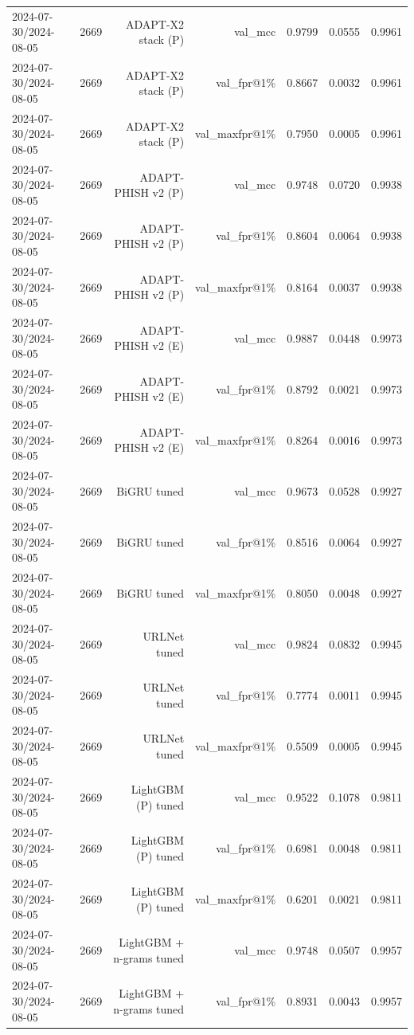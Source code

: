 \begin{table}[t]
\begin{tabular}{llrrrrr}
2024-07-30/2024-08-05 & 2669 & ADAPT-X2 stack (P) & val\_mcc & 0.9799 & 0.0555 & 0.9961 \\
2024-07-30/2024-08-05 & 2669 & ADAPT-X2 stack (P) & val\_fpr@1\% & 0.8667 & 0.0032 & 0.9961 \\
2024-07-30/2024-08-05 & 2669 & ADAPT-X2 stack (P) & val\_maxfpr@1\% & 0.7950 & 0.0005 & 0.9961 \\
2024-07-30/2024-08-05 & 2669 & ADAPT-PHISH v2 (P) & val\_mcc & 0.9748 & 0.0720 & 0.9938 \\
2024-07-30/2024-08-05 & 2669 & ADAPT-PHISH v2 (P) & val\_fpr@1\% & 0.8604 & 0.0064 & 0.9938 \\
2024-07-30/2024-08-05 & 2669 & ADAPT-PHISH v2 (P) & val\_maxfpr@1\% & 0.8164 & 0.0037 & 0.9938 \\
2024-07-30/2024-08-05 & 2669 & ADAPT-PHISH v2 (E) & val\_mcc & 0.9887 & 0.0448 & 0.9973 \\
2024-07-30/2024-08-05 & 2669 & ADAPT-PHISH v2 (E) & val\_fpr@1\% & 0.8792 & 0.0021 & 0.9973 \\
2024-07-30/2024-08-05 & 2669 & ADAPT-PHISH v2 (E) & val\_maxfpr@1\% & 0.8264 & 0.0016 & 0.9973 \\
2024-07-30/2024-08-05 & 2669 & BiGRU tuned & val\_mcc & 0.9673 & 0.0528 & 0.9927 \\
2024-07-30/2024-08-05 & 2669 & BiGRU tuned & val\_fpr@1\% & 0.8516 & 0.0064 & 0.9927 \\
2024-07-30/2024-08-05 & 2669 & BiGRU tuned & val\_maxfpr@1\% & 0.8050 & 0.0048 & 0.9927 \\
2024-07-30/2024-08-05 & 2669 & URLNet tuned & val\_mcc & 0.9824 & 0.0832 & 0.9945 \\
2024-07-30/2024-08-05 & 2669 & URLNet tuned & val\_fpr@1\% & 0.7774 & 0.0011 & 0.9945 \\
2024-07-30/2024-08-05 & 2669 & URLNet tuned & val\_maxfpr@1\% & 0.5509 & 0.0005 & 0.9945 \\
2024-07-30/2024-08-05 & 2669 & LightGBM (P) tuned & val\_mcc & 0.9522 & 0.1078 & 0.9811 \\
2024-07-30/2024-08-05 & 2669 & LightGBM (P) tuned & val\_fpr@1\% & 0.6981 & 0.0048 & 0.9811 \\
2024-07-30/2024-08-05 & 2669 & LightGBM (P) tuned & val\_maxfpr@1\% & 0.6201 & 0.0021 & 0.9811 \\
2024-07-30/2024-08-05 & 2669 & LightGBM + n-grams tuned & val\_mcc & 0.9748 & 0.0507 & 0.9957 \\
2024-07-30/2024-08-05 & 2669 & LightGBM + n-grams tuned & val\_fpr@1\% & 0.8931 & 0.0043 & 0.9957 \\

\end{tabular}
\end{table}
